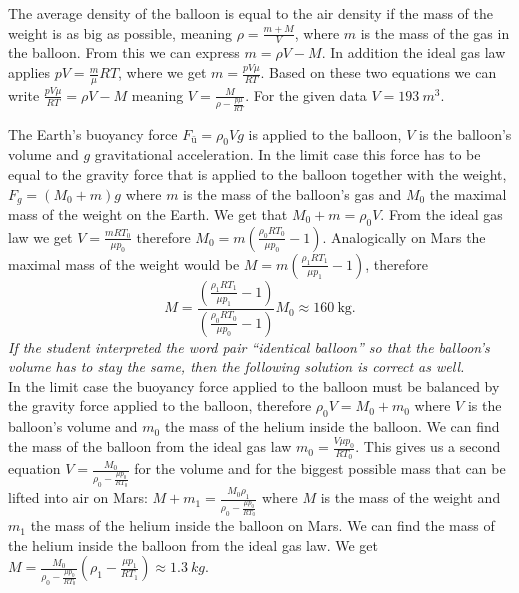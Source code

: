 \documentclass[11pt]{article}
\begin{document}

\solueng
The average density of the balloon is equal to the air density if the mass of the weight is as big as possible, meaning $\rho=\frac{m+M}{V}$, where $m$ is the mass of the gas in the balloon. From this we can express $m=\rho V-M$. In addition the ideal gas law applies $pV=\frac{m}{\mu}RT$, where we get $m=\frac{pV\mu}{RT}$. Based on these two equations we can write $\frac{pV\mu}{RT}=\rho V-M$ meaning $V=\frac{M}{\rho-\frac{p\mu}{RT}}$. For the given data $V=\SI{193}{m^3}$.
\probend
\bigskip


\solueng
The Earth’s buoyancy force $F_{ü}=\rho_0Vg$ is applied to the balloon, $V$ is the balloon’s volume and $g$ gravitational acceleration. In the limit case this force has to be equal to the gravity force that is applied to the balloon together with the weight, $F_g=(M_0+m)g$ where $m$ is the mass of the balloon’s gas and $M_0$ the maximal mass of the weight on the Earth. We get that $M_0+m=\rho_0V$. From the ideal gas law we get $V=\frac{mRT_0}{\mu p_0}$ therefore $M_0=m(\frac{\rho_0 RT_0}{\mu p_0}-1)$. Analogically on Mars the maximal mass of the weight would be $M=m(\frac{\rho_1RT_1}{\mu p_1}-1)$, therefore
\[M=\frac{(\frac{\rho_1RT_1}{\mu p_1}-1)}{(\frac{\rho_0RT_0}{\mu p_0}-1)}M_0\approx \SI{160}{\kilogram}.\] 
\emph{If the student interpreted the word pair “identical balloon” so that the balloon’s volume has to stay the same, then the following solution is correct as well.}\\
In the limit case the buoyancy force applied to the balloon must be balanced by the gravity force applied to the balloon, therefore $\rho_0 V=M_0+m_0$ where $V$ is the balloon’s volume and $m_0$ the mass of the helium inside the balloon. We can find the mass of the balloon from the ideal gas law $m_0=\frac{V\mu p_0}{RT_0}$. This gives us a second equation $V=\frac{M_0}{\rho_0-\frac{\mu p_0}{RT_0}}$ for the volume and for the biggest possible mass that can be lifted into air on Mars: $M+m_1=\frac{M_0\rho_1}{\rho_0-\frac{\mu p_0}{RT_0}}$ where $M$ is the mass of the weight and $m_1$ the mass of the helium inside the balloon on Mars. We can find the mass of the helium inside the balloon from the ideal gas law. We get $M=\frac{M_0}{\rho_0-\frac{\mu p_0}{RT_0}}(\rho_1-\frac{\mu p_1}{RT_1})\approx \SI{1,3}{kg}$.
\probend
\bigskip
\end{document}
